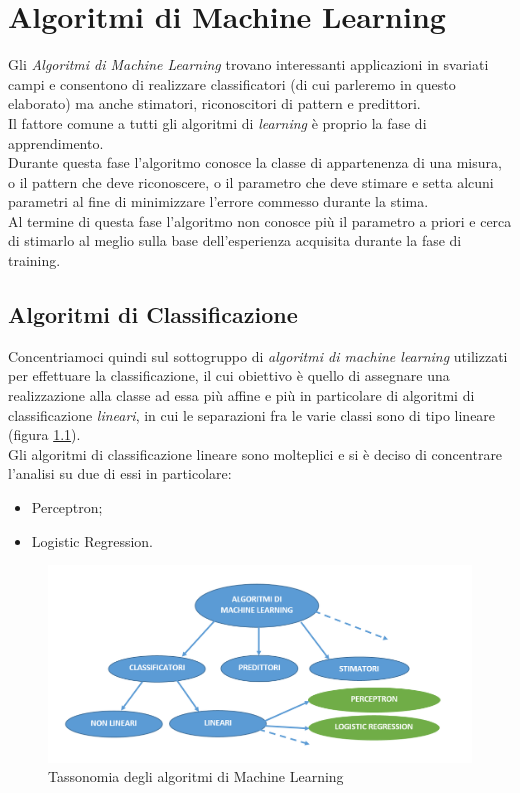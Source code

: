\chapter{Algoritmi di Machine Learning}

Gli \emph{Algoritmi di Machine Learning} trovano interessanti applicazioni in svariati campi e consentono di realizzare classificatori (di cui parleremo in questo elaborato) ma anche stimatori, riconoscitori di pattern e predittori.\\
Il fattore comune a tutti gli algoritmi di \emph{learning} \`{e} proprio la fase di apprendimento.\\ 
Durante questa fase l'algoritmo conosce la classe di appartenenza di una misura, o il pattern che deve riconoscere, o il parametro che deve stimare e setta alcuni parametri al fine di minimizzare l'errore commesso durante la stima.\\
Al termine di questa fase l'algoritmo non conosce pi\`{u} il parametro a priori e cerca di stimarlo al meglio sulla base dell'esperienza acquisita durante la fase di training.\\

\section{Algoritmi di Classificazione}
Concentriamoci quindi sul sottogruppo di \emph{algoritmi di machine learning} utilizzati per effettuare la classificazione, il cui obiettivo \`{e} quello di assegnare una realizzazione alla classe ad essa pi\`{u} affine e pi\`{u} in particolare di algoritmi di classificazione \emph{lineari}, in cui le separazioni fra le varie classi sono di tipo lineare (figura \ref{Fig:Tassonomia degli algoritmi di Machine Learning}).\\
Gli algoritmi di classificazione lineare sono molteplici e si \`{e} deciso di concentrare l'analisi su due di essi in particolare:

\begin{itemize}
	\item Perceptron;
	\item Logistic Regression.
\end{itemize}


\newpage

\begin{figure}[h]
	\centering
	\includegraphics[width=1\textwidth]{Immagini/Classificazione}
	\caption{Tassonomia degli algoritmi di Machine Learning
		\label{Fig:Tassonomia degli algoritmi di Machine Learning}}
\end{figure}


